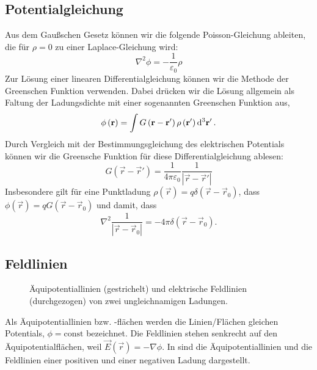 \subsection{Potentialgleichung}

Aus dem Gaußschen Gesetz können wir die folgende Poisson-Gleichung ableiten, die für $\rho =0$ zu einer Laplace-Gleichung wird:
\begin{equation}
	\label{3.8}
	\boxed{\nabla ^{2}\phi =-\frac{1}{\varepsilon _{0}}\rho }
\end{equation}
Zur Lösung einer linearen Differentialgleichung können wir die Methode der Greenschen Funktion verwenden. Dabei drücken wir die Lösung allgemein als Faltung der Ladungsdichte mit einer sogenannten Greenschen Funktion aus,
\begin{equation}
	\label{3.9}
	\phi \left(\vec {r}\right)=\int G\left(\vec {r}-\vec {r}'\right)\rho \left(\vec {r}'\right)\diffa[3]{\vec{r}'}.
\end{equation}
Durch Vergleich mit der Bestimmungsgleichung des elektrischen Potentials können wir die Greensche Funktion für diese Differentialgleichung ablesen:
\begin{equation}
	\label{3.10}
	G\left(\vec {r}-\vec {r}'\right)=\frac{1}{4\pi \varepsilon _{0}}\frac{1}{\left| \vec {r}-\vec {r}'\right| }
\end{equation}
Insbesondere gilt für eine Punktladung $\rho \left(\vec {r}\right)=q\delta \left(\vec {r}-\vec {r}_{0}\right)$, dass $\phi \left(\vec {r}\right)=qG\left(\vec {r}-\vec {r}_{0}\right)$ und damit, dass
\begin{equation*}
	\nabla ^{2}\frac{1}{\left| \vec {r}-\vec {r}_{0}\right| }=-4\pi \delta \left(\vec {r}-\vec {r}_{0}\right).
\end{equation*}



\subsection{Feldlinien}

\begin{figure}[htb]
	\centering
	\tfigDipoleFieldPotential
	\caption{Äquipotentiallinien (gestrichelt) und elektrische Feldlinien (durchgezogen) von zwei ungleichnamigen Ladungen. }
	\label{fig:dipole_field_potential}
\end{figure}

Als Äquipotentiallinien bzw. -flächen werden die Linien/Flächen gleichen Potentials, $\phi =\text{const}$ bezeichnet. Die Feldlinien stehen senkrecht auf den Äquipotentialflächen, weil $\vec {E}\left(\vec {r}\right)=-\nabla \phi $. In  sind die Äquipotentiallinien und die Feldlinien einer positiven und einer negativen Ladung dargestellt.



